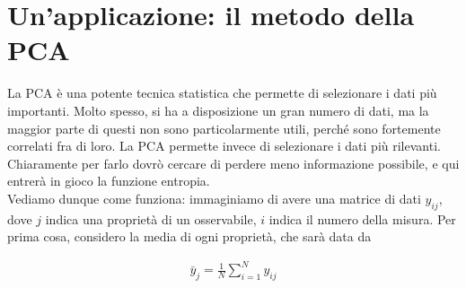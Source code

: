 \documentclass{report}
\begin{document}

\section{Un'applicazione: il metodo della PCA}

La PCA è una potente tecnica statistica che permette di selezionare i dati più importanti. Molto spesso, si ha a disposizione un gran numero di dati, ma la maggior parte di questi non sono particolarmente utili, perché sono fortemente correlati fra di loro. La PCA permette invece di selezionare i dati più rilevanti. Chiaramente per farlo dovrò cercare di perdere meno informazione possibile, e qui entrerà in gioco la funzione entropia. \\

Vediamo dunque come funziona: immaginiamo di avere una matrice di dati \(y_{ij}\), dove \(j\) indica una proprietà di un osservabile, \(i\) indica il numero della misura. Per prima cosa, considero la media di ogni proprietà, che sarà data da 

\begin{align}
    \bar{y}_j = \frac{1}{N}\sum_{i=1}^N y_{ij}
\end{align}
\end{document}
